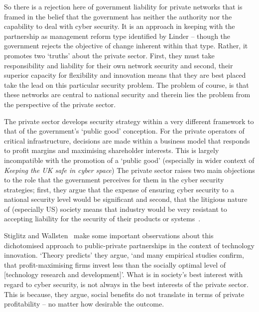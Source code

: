 \documentclass[a4paper,11pt]{article}
\begin{document}
So there is a rejection here of government liability for private
networks that is framed in the belief that the government has neither
the authority nor the capability to deal with cyber security. It is an
approach in keeping with the partnership as management reform type
identified by Linder -- though the government rejects the objective of
change inherent within that type. Rather, it promotes two `truths'
about the private sector. First, they must take responsibility and
liability for their own network security and second, their superior
capacity for flexibility and innovation means that they are best
placed take the lead on this particular security problem. The problem
of course, is that these networks are central to national security and
therein lies the problem from the perspective of the private sector.

The private sector develops security strategy within a very different
framework to that of the government's `public good' conception. For
the private operators of critical infrastructure, decisions are made
within a business model that responds to profit margins and maximising
shareholder interests. This is largely incompatible with the promotion
of a `public good' (especially in wider context of {\emph{Keeping the UK
safe in cyber space}}\cite{keepingukcybersafe:2014}) The private
sector raises two main objections to the role that the government
perceives for them in the cyber security strategies; first, they argue
that the expense of ensuring cyber security to a national security
level would be significant and second, that the litigious nature of
(especially US) society means that industry would be very resistant to
accepting liability for the security of their products or
systems~\cite{paller:2005}.

Stiglitz and Wallsten~\cite{stiglitz+wallsten:1999} make some
important observations about this dichotomised approach to
public-private partnerships in the context of technology
innovation. `Theory predicts' they argue, `and many empirical studies
confirm, that profit-maximising firms invest less than the socially
optimal level of [technology research and development]'. What is in
society's best interest with regard to cyber security, is not always
in the best interests of the private sector. This is because, they
argue, social benefits do not translate in terms of private
profitability -- no matter how desirable the outcome.
\end{document}
